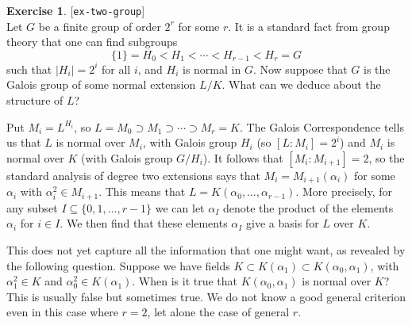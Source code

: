 \documentclass{amsart}
\newcommand{\Q}         {{\mathbb{Q}}}
\newcommand{\al}        {\alpha}
\newcommand{\bt}        {\beta}
\newcommand{\sse}       {\subseteq}
\renewcommand{\:}{\colon}
\newcommand{\lastexlabel}{}
\newcommand{\exlabel}[1]{
 \global\def\lastexlabel{#1}\label{#1}[\texttt{#1}]\ \\
}
\newcommand{\exlabel}[1]{
 \global\def\lastexlabel{#1}\label{#1}
}
\newenvironment{solution}{\SolutionInline}{\endSolutionInline}
\theoremstyle{definition}
\newtheorem{exercise}{Exercise}[section]
\renewenvironment{solution}{\SolutionAtEnd}{\endSolutionAtEnd}
\begin{document}
\begin{solution}
\begin{itemize}
\begin{center}
   \end{center}
 \end{itemize}
\end{solution}

\begin{exercise}\exlabel{ex-two-group}
 Let $G$ be a finite group of order $2^r$ for some $r$.  It is a
 standard fact from group theory that one can find subgroups
 \[ \{1\} = H_0 < H_1 < \dotsb < H_{r-1} < H_r = G \]
 such that $|H_i|=2^i$ for all $i$, and $H_i$ is normal in $G$.  Now
 suppose that $G$ is the Galois group of some normal extension $L/K$.
 What can we deduce about the structure of $L$?
\end{exercise}
\begin{solution}
 Put $M_i=L^{H_i}$, so $L=M_0\supset M_1\supset\dotsb\supset M_r=K$.
 The Galois Correspondence tells us that $L$ is normal over $M_i$,
 with Galois group $H_i$ (so $[L:M_i]=2^i$) and $M_i$ is normal over
 $K$ (with Galois group $G/H_i$).  It follows that $[M_i:M_{i+1}]=2$,
 so the standard analysis of degree two extensions says that
 $M_i=M_{i+1}(\al_i)$ for some $\al_i$ with $\al_i^2\in M_{i+1}$.
 This means that $L=K(\al_0,\dotsc,\al_{r-1})$.  More precisely, for
 any subset $I\sse\{0,1,\dotsc,r-1\}$ we can let $\al_I$ denote the
 product of the elements $\al_i$ for $i\in I$.  We then find that
 these elements $\al_I$ give a basis for $L$ over $K$.

 This does not yet capture all the information that one might want, as
 revealed by the following question.  Suppose we have fields
 $K\subset K(\al_1)\subset K(\al_0,\al_1)$, with $\al_1^2\in K$ and
 $\al_0^2\in K(\al_1)$.  When is it true that $K(\al_0,\al_1)$ is
 normal over $K$?  This is usually false but sometimes true.  We do
 not know a good general criterion even in this case where $r=2$, let
 alone the case of general $r$.
\end{solution}
\end{document}

